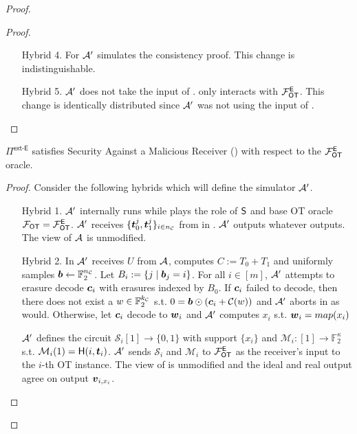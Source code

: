 \begin{proof}
\begin{proof}
\begin{enumerate}[leftmargin=1.8cm]
			\item[Hybrid 4.] For  $\mathcal{A}'$ simulates the consistency proof. This change is indistinguishable. 
			
			\item[Hybrid 5.] $\mathcal{A}'$ does not take the input of \rec. \rec only interacts with $\mathcal{F}_{\mathsf{OT}}^\mathsf{E}$. This change is identically distributed since $\mathcal{A}'$ was not using the input of \rec.
		\end{enumerate}
	\end{proof}

	\begin{claim}\label{claim:ext-E-MalReceiver}
	$\Pi^\textsf{ext-E}$ satisfies Security Against a Malicious Receiver () with respect to the $\mathcal{F}_{\mathsf{OT}}^\mathsf{E}$ oracle.
	\end{claim}
	\begin{proof}
				Consider the following hybrids which will define the simulator $\mathcal{A}'$. 
		\begin{enumerate}[leftmargin=1.8cm]
			\item[Hybrid 1.] $\mathcal{A}'$ internally runs \Adv while plays the role of $\mathsf{S}$ and base OT oracle $\mathcal{F}_{\mathsf{OT}}=\mathcal{F}_{\mathsf{OT}}^\mathsf{E}$. $\mathcal{A}'$ receives $\{\boldsymbol{t}^j_0,\boldsymbol{t}^j_1\}_{i\in{n_\mathcal{C}}}$ from \Adv in . $\mathcal{A}'$ outputs whatever \Adv outputs. The view of $\mathcal{A}$ is unmodified.
			
			\item[Hybrid 2.] In  $\mathcal{A}'$ receives $U$ from $\mathcal{A}$, computes $C:=T_0+T_1$ and uniformly samples $\boldsymbol{b}\gets\mathbb{F}^{{n_\mathcal{C}}}_2$. Let  $B_i:=\{j \mid \boldsymbol{b}_j = i\}$. For all $i\in[m]$, $\mathcal{A}'$ attempts to erasure decode $\boldsymbol{c}_i$ with erasures indexed by $B_0$. If $\boldsymbol{c}_i$ failed to decode, then there does not exist a $w\in\mathbb{F}^{{k_\mathcal{C}}}_2$ s.t. $0=\boldsymbol{b}\odot (\boldsymbol{c}_i+\mathcal{C}(w))$ and $\mathcal{A}'$ aborts in  as \send would. Otherwise, let $\boldsymbol{c}_i$ decode to $\boldsymbol{w}_i$ and $\mathcal{A}'$ computes $x_i$ s.t. $\boldsymbol{w}_i=map(x_i)$
			
			
			$\mathcal{A}'$ defines the circuit $\mathcal{S}_i[1]\rightarrow\{0,1\}$ with support $\{x_i\}$ and $\mathcal{M}_i:[1]\rightarrow\mathbb{F}^\kappa_2$ s.t. $\mathcal{M}_i(1)=\mathsf{H}(i, \boldsymbol{t}_i)$. $\mathcal{A}'$ sends $\mathcal{S}_i$ and $\mathcal{M}_i$ to $\mathcal{F}_{\mathsf{OT}}^\mathsf{E}$ as the receiver's input to the $i$-th OT instance. The view of \Adv is unmodified and the ideal and real output agree on output $\boldsymbol{v}_{i,x_i}$.
			

\end{enumerate}
\end{proof}
\end{proof}
